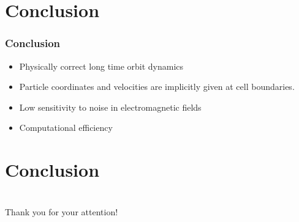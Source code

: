 \documentclass{beamer}
\begin{document}
\section{Conclusion}
\begin{frame}
\frametitle{Conclusion}
\vspace*{-0.5cm}
\begin{itemize}
\item Physically correct long time orbit dynamics
\item Particle coordinates and velocities are implicitly given at cell boundaries.
\item Low sensitivity to noise in electromagnetic fields
\item Computational efficiency
\end{itemize}
\end{frame}

\section{Conclusion}



\section{ }
 \begin{frame}
\vspace*{2.5cm}
\centerline{\huge Thank you for your attention!}
 \end{frame}



\end{document}
